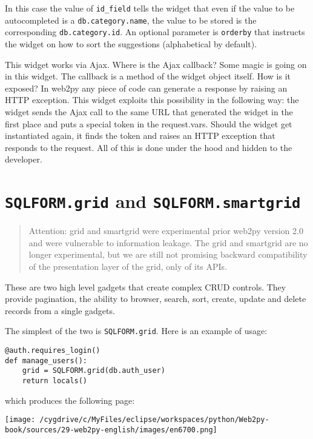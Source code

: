 \documentclass[justified,sixbynine,notoc]{tufte-book}
\def\ft{\small\tt}
\begin{document}
\begin{fullwidth}
In this case the value of {\ft id\_field} tells the widget that even if the value to be autocompleted is a {\ft db.category.name}, the value to be stored is the corresponding {\ft db.category.id}. An optional parameter is {\ft orderby} that instructs the widget on how to sort the suggestions (alphabetical by default).

This widget works via Ajax. Where is the Ajax callback? Some magic is going on in this widget. The callback is a method of the widget object itself. How is it exposed? In web2py any piece of code can generate a response by raising an HTTP exception. This widget exploits this possibility in the following way: the widget sends the Ajax call to the same URL that generated the widget in the first place and puts a special token in the request.vars. Should the widget get instantiated again, it finds the token and raises an HTTP exception that responds to the request. All of this is done under the hood and hidden to the developer.

\goodbreak\section{{\ft SQLFORM.grid} and {\ft SQLFORM.smartgrid}}

\begin{quote}Attention: grid and smartgrid were experimental prior web2py version 2.0 and were vulnerable to information leakage. The grid and smartgrid are no longer experimental, but we are still not promising backward compatibility of the presentation layer of the grid, only of its APIs.\end{quote}
These are two high level gadgets that create complex CRUD controls. They provide pagination, the ability to browser, search, sort, create, update and delete records from a single gadgets.

The simplest of the two is {\ft SQLFORM.grid}. Here is an example of usage:

\begin{lstlisting}
@auth.requires_login()
def manage_users():
    grid = SQLFORM.grid(db.auth_user)
    return locals()
\end{lstlisting}
\noindent which produces the following page:


\goodbreak\begin{center}\texttt{[image: /cygdrive/c/MyFiles/eclipse/workspaces/python/Web2py-book/sources/29-web2py-english/images/en6700.png]}\end{center}



\end{fullwidth}
\end{document}
